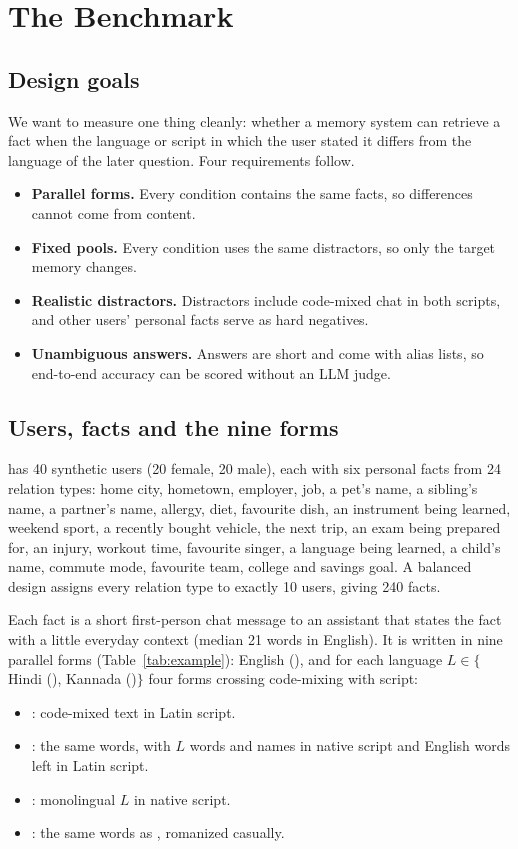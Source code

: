 \section{The \lipi{} Benchmark}
\label{sec:benchmark}

\subsection{Design goals}
We want to measure one thing cleanly: whether a memory system can retrieve a fact when the language or script in which the user stated it differs from the language of the later question. Four requirements follow.
\begin{itemize}
\item \textbf{Parallel forms.} Every condition contains the same facts, so differences cannot come from content.
\item \textbf{Fixed pools.} Every condition uses the same distractors, so only the target memory changes.
\item \textbf{Realistic distractors.} Distractors include code-mixed chat in both scripts, and other users' personal facts serve as hard negatives.
\item \textbf{Unambiguous answers.} Answers are short and come with alias lists, so end-to-end accuracy can be scored without an LLM judge.
\end{itemize}

\subsection{Users, facts and the nine forms}
\lipi{} has 40 synthetic users (20 female, 20 male), each with six personal facts from 24 relation types: home city, hometown, employer, job, a pet's name, a sibling's name, a partner's name, allergy, diet, favourite dish, an instrument being learned, weekend sport, a recently bought vehicle, the next trip, an exam being prepared for, an injury, workout time, favourite singer, a language being learned, a child's name, commute mode, favourite team, college and savings goal. A balanced design assigns every relation type to exactly 10 users, giving 240 facts.

Each fact is a short first-person chat message to an assistant that states the fact with a little everyday context (median 21 words in English). It is written in nine parallel forms (Table~\ref{tab:example}): English (), and for each language $L\in\{$Hindi (), Kannada ()$\}$ four forms crossing code-mixing with script:
\begin{itemize}
\item {}: code-mixed text in Latin script.
\item {}: the same words, with $L$ words and names in native script and English words left in Latin script.
\item {}: monolingual $L$ in native script.
\item {}: the same words as , romanized casually.
\end{itemize}

